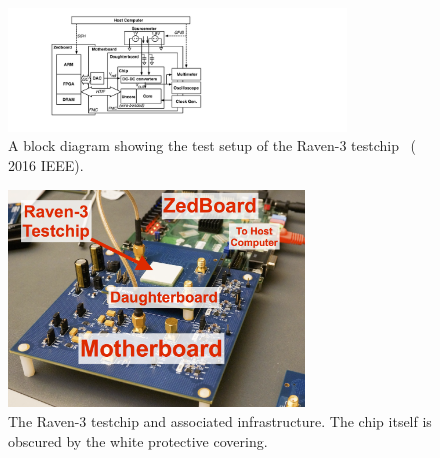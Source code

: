 \documentclass[graybox]{svmult}
\begin{document}
\begin{figure}
  \centering
  \includegraphics[width=0.8\textwidth]{6-raven3-test-setup-diagram}
  \caption{A block diagram showing the test setup of the Raven-3 testchip~\cite{Zimmer2016} ({\textcopyright} 2016 IEEE).}
  \label{fig:6-raven3-test-setup-diagram}
\end{figure}

\begin{figure}
  \centering
  \includegraphics[width=0.7\textwidth]{6-raven3-test-setup}
  \caption{The Raven-3 testchip and associated infrastructure.  The chip itself is obscured by the white protective covering.}
  \label{fig:6-raven3-test-setup}
\end{figure}
\end{document}

